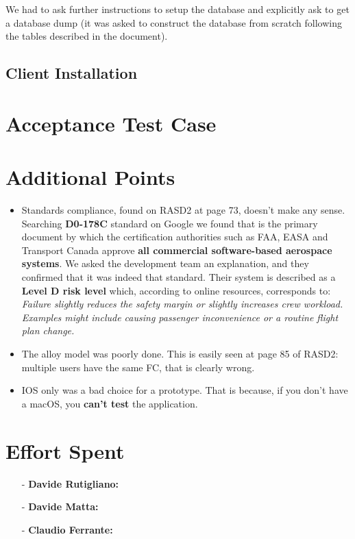 \documentclass[a4paper]{article}
\begin{document}
We had to ask further instructions to setup the database and explicitly ask to get a database dump (it was asked to construct the database from scratch following the tables described in the document).\\

\subsection{Client Installation}

\newpage
\section{Acceptance Test Case}

\newpage
\section{Additional Points}
\begin{itemize}
    \item Standards compliance, found on RASD2 at page 73, doesn't make any sense. Searching \textbf{D0-178C} standard on Google we found that is the primary document by which the certification authorities such as FAA, EASA and Transport Canada approve \textbf{all commercial software-based aerospace systems}. We asked the development team an explanation, and they confirmed that it was indeed that standard.
    Their system is described as a \textbf{Level D risk level} which, according to online resources, corresponds to: \textit{Failure slightly reduces the safety margin or slightly increases crew workload. Examples might include causing passenger inconvenience or a routine flight plan change.}
    \item The alloy model was poorly done. This is easily seen at page 85 of RASD2: multiple users have the same FC, that is clearly wrong.
    \item IOS only was a bad choice for a prototype. That is because, if you don't have a macOS, you \textbf{can't test} the application.
\end{itemize}

\newpage
\section{Effort Spent}
    \begin{itemize}
        \item[-] \textbf{Davide Rutigliano:}
        
        \item[-] \textbf{Davide Matta:}
        
        \item[-] \textbf{Claudio Ferrante:}
    \end{itemize}
\end{document}
